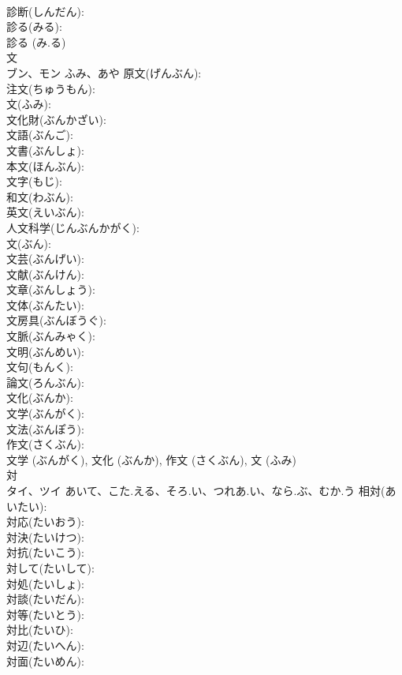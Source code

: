 \documentclass[8pt]{extreport}
\begin{document}
\begin{CJK}{UTF8}{min}
\\	診断(しんだん): 
\\	診る(みる): 
\\	診る (み.る)
\\	文			
\\	ブン、モン	ふみ、あや	原文(げんぶん): 
\\	注文(ちゅうもん): 
\\	文(ふみ): 
\\	文化財(ぶんかざい): 
\\	文語(ぶんご): 
\\	文書(ぶんしょ): 
\\	本文(ほんぶん): 
\\	文字(もじ): 
\\	和文(わぶん): 
\\	英文(えいぶん): 
\\	人文科学(じんぶんかがく): 
\\	文(ぶん): 
\\	文芸(ぶんげい): 
\\	文献(ぶんけん): 
\\	文章(ぶんしょう): 
\\	文体(ぶんたい): 
\\	文房具(ぶんぼうぐ): 
\\	文脈(ぶんみゃく): 
\\	文明(ぶんめい): 
\\	文句(もんく): 
\\	論文(ろんぶん): 
\\	文化(ぶんか): 
\\	文学(ぶんがく): 
\\	文法(ぶんぽう): 
\\	作文(さくぶん): 
\\	文学 (ぶんがく), 文化 (ぶんか), 作文 (さくぶん), 文 (ふみ)
\\	対			
\\	タイ、ツイ	あいて、こた.える、そろ.い、つれあ.い、なら.ぶ、むか.う	相対(あいたい): 
\\	対応(たいおう): 
\\	対決(たいけつ): 
\\	対抗(たいこう): 
\\	対して(たいして): 
\\	対処(たいしょ): 
\\	対談(たいだん): 
\\	対等(たいとう): 
\\	対比(たいひ): 
\\	対辺(たいへん): 
\\	対面(たいめん): 

\end{CJK}
\end{document}
